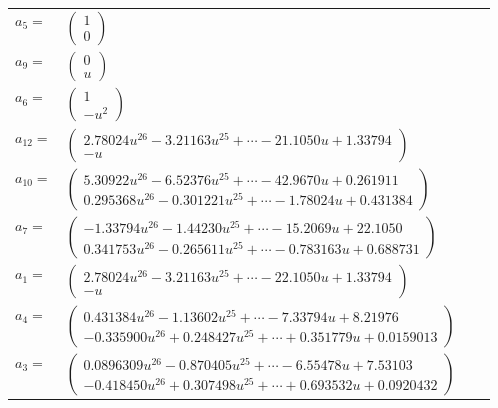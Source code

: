 \documentclass[1p]{elsarticle_modified}
\theoremstyle{definition}
\begin{document}
\begin{tabular}{m{7pt} m{180pt} m{7pt} m{180pt} }
\flushright $a_{5}=$&$\begin{pmatrix}1\\0\end{pmatrix}$ \\
\flushright $a_{9}=$&$\begin{pmatrix}0\\u\end{pmatrix}$ \\
\flushright $a_{6}=$&$\begin{pmatrix}1\\- u^2\end{pmatrix}$ \\
\flushright $a_{12}=$&$\begin{pmatrix}2.78024 u^{26}-3.21163 u^{25}+\cdots-21.1050 u+1.33794\\- u\end{pmatrix}$ \\
\flushright $a_{10}=$&$\begin{pmatrix}5.30922 u^{26}-6.52376 u^{25}+\cdots-42.9670 u+0.261911\\0.295368 u^{26}-0.301221 u^{25}+\cdots-1.78024 u+0.431384\end{pmatrix}$ \\
\flushright $a_{7}=$&$\begin{pmatrix}-1.33794 u^{26}-1.44230 u^{25}+\cdots-15.2069 u+22.1050\\0.341753 u^{26}-0.265611 u^{25}+\cdots-0.783163 u+0.688731\end{pmatrix}$ \\
\flushright $a_{1}=$&$\begin{pmatrix}2.78024 u^{26}-3.21163 u^{25}+\cdots-22.1050 u+1.33794\\- u\end{pmatrix}$ \\
\flushright $a_{4}=$&$\begin{pmatrix}0.431384 u^{26}-1.13602 u^{25}+\cdots-7.33794 u+8.21976\\-0.335900 u^{26}+0.248427 u^{25}+\cdots+0.351779 u+0.0159013\end{pmatrix}$ \\
\flushright $a_{3}=$&$\begin{pmatrix}0.0896309 u^{26}-0.870405 u^{25}+\cdots-6.55478 u+7.53103\\-0.418450 u^{26}+0.307498 u^{25}+\cdots+0.693532 u+0.0920432\end{pmatrix}$ \\

\end{tabular}
\end{document}
